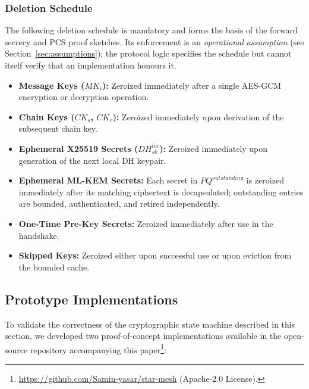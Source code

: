 \documentclass[11pt,a4paper]{article}
\theoremstyle{remark}
\theoremstyle{plain}
\begin{document}
\subsubsection{Deletion Schedule}
\label{sec:deletion}

The following deletion schedule is mandatory and forms the basis of the forward secrecy and
PCS proof sketches.  Its enforcement is an \emph{operational assumption} (see
Section~\ref{sec:assumptions}); the protocol logic specifies the schedule but cannot itself
verify that an implementation honours it.

\begin{itemize}
  \item \textbf{Message Keys ($MK_i$):} Zeroized immediately after a single AES-GCM
        encryption or decryption operation.
  \item \textbf{Chain Keys ($CK_s$, $CK_r$):} Zeroized immediately upon derivation of the
        subsequent chain key.
  \item \textbf{Ephemeral X25519 Secrets ($DH^{loc}_{sk}$):} Zeroized immediately upon
        generation of the next local DH keypair.
  \item \textbf{Ephemeral ML-KEM Secrets:} Each secret in $PQ^{outstanding}$ is zeroized
        immediately after its matching ciphertext is decapsulated; outstanding entries are
        bounded, authenticated, and retired independently.
  \item \textbf{One-Time Pre-Key Secrets:} Zeroized immediately after use in the handshake.
  \item \textbf{Skipped Keys:} Zeroized either upon successful use or upon eviction from the
        bounded cache.
\end{itemize}

\subsection{Prototype Implementations}
\label{sec:poc}

To validate the correctness of the cryptographic state machine described in this section, we
developed two proof-of-concept implementations available in the open-source repository
accompanying this paper\footnote{\url{https://github.com/Samin-yasar/star-mesh} (Apache-2.0 License).}:
\end{document}
